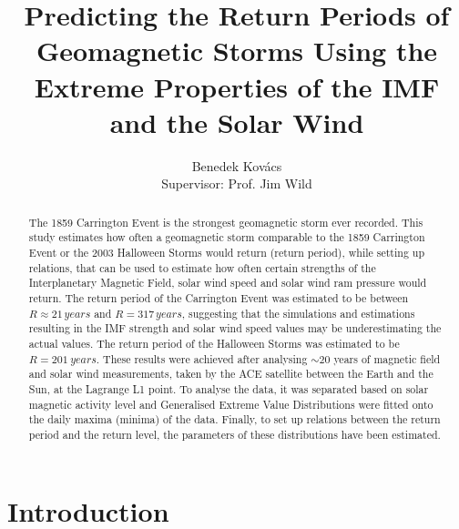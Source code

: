 \documentclass[12pt]{article}
\title{\vspace{-1em}Predicting the Return Periods of Geomagnetic Storms Using the Extreme Properties of the IMF and the Solar Wind}
\author{Benedek Kovács\\ Supervisor: Prof. Jim Wild}
\date{}
\begin{document}
\maketitle
\begin{center}
\end{center}
\bigskip
\begin{abstract}
    \noindent The 1859 Carrington Event is the strongest geomagnetic storm ever recorded. This study estimates how often a geomagnetic storm comparable to the 1859 Carrington Event or the 2003 Halloween Storms would return (return period), while setting up relations, that can be used to estimate how often certain strengths of the Interplanetary Magnetic Field, solar wind speed and solar wind ram pressure would return. The return period of the Carrington Event was estimated to be between $R\approx 21\, years$ and $R=317\, years$, suggesting that the simulations and estimations resulting in the IMF strength and solar wind speed values may be underestimating the actual values. The return period of the Halloween Storms was estimated to be $R=201\ years$. These results were achieved after analysing $\sim 20$ years of magnetic field and solar wind measurements, taken by the ACE satellite between the Earth and the Sun, at the Lagrange L1 point. To analyse the data, it was separated based on solar magnetic activity level and Generalised Extreme Value Distributions were fitted onto the daily maxima (minima) of the data. Finally, to set up relations between the return period and the return level, the parameters of these distributions have been estimated.
\end{abstract}
\newpage
\restoregeometry
\tableofcontents
\newpage
\pagestyle{fancy}
\fancyhf{}
\lhead{\leftmark}
\cfoot{\thepage}

\section{Introduction}\label{sec:introduction}
\end{document}

